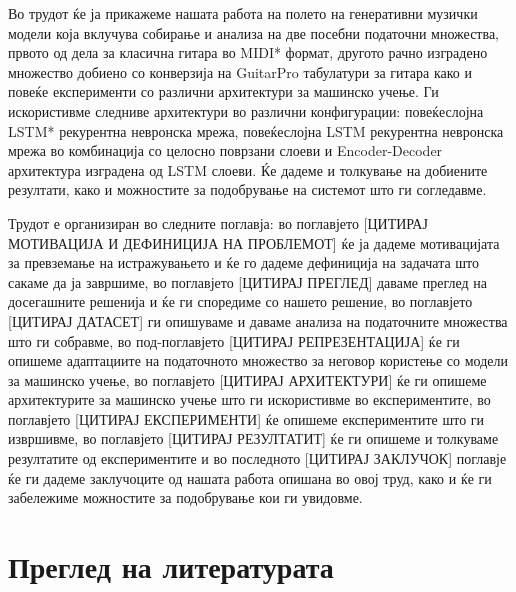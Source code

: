 Во трудот ќе ја прикажеме нашата работа на полето на генеративни музички модели која вклучува собирање и анализа на две посебни податочни множества, првото од дела за класична гитара во MIDI* формат, другото рачно изградено множество добиено со конверзија на GuitarPro табулатури за гитара како и повеќе експерименти со различни архитектури за машинско учење. Ги искористивме следниве архитектури во различни конфигурации: повеќеслојна LSTM* рекурентна невронска мрежа, повеќеслојна LSTM рекурентна невронска мрежа во комбинација со целосно поврзани слоеви и Encoder-Decoder архитектура изградена од LSTM слоеви. Ќе дадеме и толкување на добиените резултати, како и можностите за подобрување на системот што ги согледавме.

Трудот е организиран во следните поглавја: во поглавјето [ЦИТИРАЈ МОТИВАЦИЈА И ДЕФИНИЦИЈА НА ПРОБЛЕМОТ] ќе ја дадеме мотивацијата за превземање на истражувањето и ќе го дадеме дефиниција на задачата што сакаме да ја завршиме, во поглавјето [ЦИТИРАЈ ПРЕГЛЕД] даваме преглед на досегашните решенија и ќе ги споредиме со нашето решение, во поглавјето [ЦИТИРАЈ ДАТАСЕТ] ги опишуваме и даваме анализа на податочните множества што ги собравме, во под-поглавјето [ЦИТИРАЈ РЕПРЕЗЕНТАЦИЈА] ќе ги опишеме адаптациите на податочното множество за неговор користење со модели за машинско учење, во поглавјето [ЦИТИРАЈ АРХИТЕКТУРИ] ќе ги опишеме архитектурите за машинско учење што ги искористивме во експериментите, во поглавјето [ЦИТИРАЈ ЕКСПЕРИМЕНТИ] ќе опишеме експериментите што ги извршивме, во поглавјето [ЦИТИРАЈ РЕЗУЛТАТИТ] ќе ги опишеме и толкуваме резултатите од експериментите и во последното [ЦИТИРАЈ ЗАКЛУЧОК] поглавје ќе ги дадеме заклучоците од нашата работа опишана во овој труд, како и ќе ги забележиме можностите за подобрување кои ги увидовме.

\chapter{Преглед на литературата}

